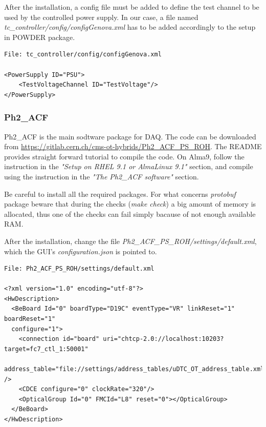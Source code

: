\documentclass[10pt,a4paper]{article}
\begin{document}
After the installation, a config file must be added to define the test channel to be used by the controlled power supply.
In our case, a file named {\it tc\_controller/config/configGenova.xml} has to be added accordingly to the setup in POWDER package.

\begin{framed}
\begin{verbatim}
File: tc_controller/config/configGenova.xml

<PowerSupply ID="PSU">
    <TestVoltageChannel ID="TestVoltage"/>
</PowerSupply>
\end{verbatim}
\end{framed}

\subsubsection{Ph2\_ACF}
\label{ph2_acf}

Ph2\_ACF is the main sodtware package for DAQ.
The code can be downloaded from \url{https://gitlab.cern.ch/cms-ot-hybrids/Ph2_ACF_PS_ROH}. 
The README provides straight forward tutorial to compile the code. On Alma9, follow the instruction in the \emph{"Setup on RHEL 9.1 or AlmaLinux 9.1"} section, and compile using the instruction in the \emph{"The Ph2\_ACF software"} section.

Be careful to install all the required packages. For what concerns {\it protobuf} package beware that during the checks (\emph{make check}) a big amount of memory is allocated, thus one of the checks can fail simply bacause of not enough available RAM.  


After the installation, change the file \emph{Ph2\_ACF\_PS\_ROH/settings/default.xml}, which the GUI's \emph{configuration.json} is pointed to.

\begin{framed}
\begin{verbatim}
File: Ph2_ACF_PS_ROH/settings/default.xml

<?xml version="1.0" encoding="utf-8"?>
<HwDescription>
  <BeBoard Id="0" boardType="D19C" eventType="VR" linkReset="1" boardReset="1" 
  configure="1">
    <connection id="board" uri="chtcp-2.0://localhost:10203?target=fc7_ctl_1:50001"    
    address_table="file://settings/address_tables/uDTC_OT_address_table.xml" />
    <CDCE configure="0" clockRate="320"/>
    <OpticalGroup Id="0" FMCId="L8" reset="0"></OpticalGroup>
  </BeBoard>
</HwDescription>

\end{verbatim}
\end{framed}
\end{document}
